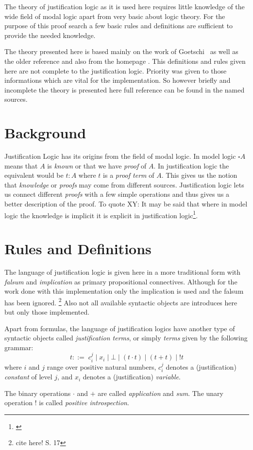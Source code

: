 The theory of justification logic as it is used here requires little knowledge of the wide field of modal logic apart from very basic about logic theory. For the purpose of this proof search a few basic rules and definitions are sufficient to provide the needed knowledge. 

The theory presented here is based mainly on the work of Goetschi~\cite{goet} as well as the older reference \cite{art} and also from the homepage \cite{stan}. This definitions and rules given here are not complete to the justification logic. Priority was given to those informations which are vital for the implementation. So however briefly and incomplete the theory is presented here full reference can be found in the named sources. 

\section{Background}
Justification Logic has its origins from the field of modal logic. 
In model logic $\square A$ means that $A$ is \emph{known} or that we have \emph{proof} of $A$. In justification logic the equivalent would be $t:A$ where $t$ is a \emph{proof term} of $A$. This gives us the notion that \emph{knowledge} or \emph{proofs} may come from different sources. Justification logic lets us connect different \emph{proofs} with a few simple operations and thus gives us a better description of the proof. To quote XY: It may be said that where in model logic the knowledge is implicit it is explicit in justification logic\footnote{\cite{goet}}.

\section{Rules and Definitions}

The language of justification logic is given here in a more traditional form with \emph{falsum} and \emph{implication} as primary propositional connectives. Although for the work done with this implementation only the implication is used and the falsum has been ignored. \footnote{cite here! S. 17} Also not all available syntactic objects are introduces here but only those implemented.

\begin{definition}\label{justification_terms} Apart from formulas, the language of justification logics have another type of syntactic objects called \emph{justification terms}, or simply \emph{terms} given by the following grammar:
\[
	t::=  \;c_{i}^{j}\; |\; x_i \;|\; \bot \; |\; (t \cdot t)\; |\; (t+t)\; |\; !t
\]
where $i$ and $j$ range over positive natural numbers, $c_{i}^{j}$ denotes a (justification) \emph{constant} of level $j$, and $x_i$ denotes a (justification) \emph{variable}.

The binary operations $\cdot$ and $+$ are called \emph{application} and \emph{sum}. The unary operation $!$ is called \emph{positive introspection}.
\end{definition}

